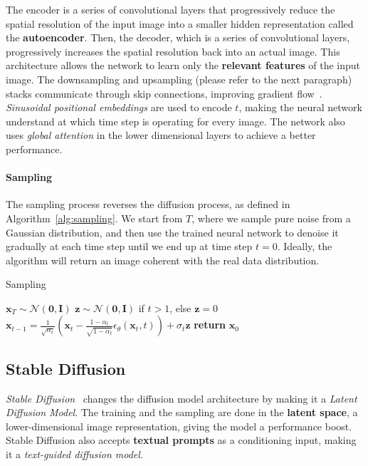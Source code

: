 \documentclass[preprint]{elsarticle}
\begin{document}
The encoder is a series of convolutional layers that progressively reduce the spatial resolution of the input image  into a smaller hidden representation called the \textbf{autoencoder}.
Then, the decoder, which is a series of convolutional layers, progressively increases the spatial resolution back into an actual image. This architecture allows the network to learn only the \textbf{relevant features} of the input image. The downsampling and upsampling (please refer to the next paragraph)  stacks communicate through skip connections, improving gradient flow~\cite{he2015deep}. \emph{Sinusoidal positional embeddings} are used to encode $t$,  making the neural network understand at which time step is operating for every image.
The network also uses \emph{global attention} in the lower dimensional layers to achieve a better performance.

\paragraph{Sampling}
The sampling process reverses the diffusion process, as defined in Algorithm~\ref{alg:sampling}. We start from $T$, where we sample pure noise from a Gaussian distribution, 
and then use the trained neural network to denoise it gradually at each time step until we end up at time step $t=0$.
Ideally, the algorithm will return an image coherent with the real data distribution.

\begin{algorithm}[t]
    \caption{Sampling}\label{alg:sampling}
    \begin{algorithmic}[1]
    \State $\mathbf{x}_T \sim \mathcal{N}(\mathbf{0},\mathbf{I})$
        \State $\mathbf{z} \sim \mathcal{N}(\mathbf{0}, \mathbf{I})$ if $t >1$, else $\mathbf{z} =0$
        \State $\mathbf{x}_{t-1} = \frac{1}{\sqrt{\alpha_t}}\left(\mathbf{x}_t - \frac{1-\alpha_t}{\sqrt{1-\bar{\alpha}_t}}\epsilon_\theta(\mathbf{x}_t,t)\right) + \sigma_t \mathbf{z}$
    \EndFor
    \State \textbf{return} $\mathbf{x}_0$
    \end{algorithmic}
\end{algorithm}





\subsection{Stable Diffusion}\label{sec:stable-diffusion}

\emph{Stable Diffusion}~\cite{rombach2022highresolution} changes the diffusion model architecture by making 
it a \emph{Latent Diffusion Model}. 
The training and the sampling are done in the \textbf{latent space}, 
a lower-dimensional image representation, giving the model a performance boost.
Stable Diffusion also accepts \textbf{textual prompts} as a conditioning input, making it a \emph{text-guided diffusion model}.
\end{document}
